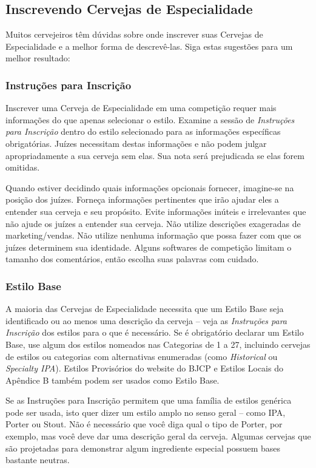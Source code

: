 \subsection*{Inscrevendo Cervejas de Especialidade}
Muitos cervejeiros têm dúvidas sobre onde inscrever suas Cervejas de Especialidade e a melhor forma de descrevê-las. Siga estas sugestões para um melhor resultado:
\subsubsection*{Instruções para Inscrição}
Inscrever uma Cerveja de Especialidade em uma competição requer mais informações do que apenas selecionar o estilo. Examine a sessão de \textit{Instruções para Inscrição} dentro do estilo selecionado para as informações específicas obrigatórias. Juízes necessitam destas informações e não podem julgar apropriadamente a sua cerveja sem elas. Sua nota será prejudicada se elas forem omitidas.

Quando estiver decidindo quais informações opcionais fornecer, imagine-se na posição dos juízes. Forneça informações pertinentes que irão ajudar eles a entender sua cerveja e seu propósito. Evite informações inúteis e irrelevantes que não ajude os juízes a entender sua cerveja. Não utilize descrições exageradas de marketing/vendas. Não utilize nenhuma informação que possa fazer com que os juízes determinem sua identidade. Alguns softwares de competição limitam o tamanho dos comentários, então escolha suas palavras com cuidado.

\subsubsection*{Estilo Base}
A maioria das Cervejas de Especialidade necessita que um Estilo Base seja identificado ou ao menos uma descrição da cerveja – veja as \textit{Instruções para Inscrição} dos estilos para o que é necessário. Se é obrigatório declarar um Estilo Base, use algum dos estilos nomeados nas Categorias de 1 a 27, incluindo cervejas de estilos ou categorias com alternativas enumeradas (como \textit{Historical} ou \textit{Specialty IPA}). Estilos Provisórios do website do BJCP e Estilos Locais do Apêndice B também podem ser usados como Estilo Base.

Se as Instruções para Inscrição permitem que uma família de estilos genérica pode ser usada, isto quer dizer um estilo amplo no senso geral – como IPA, Porter ou Stout. Não é necessário que você diga qual o tipo de Porter, por exemplo, mas você deve dar uma descrição geral da cerveja. Algumas cervejas que são projetadas para demonstrar algum ingrediente especial possuem bases bastante neutras.

